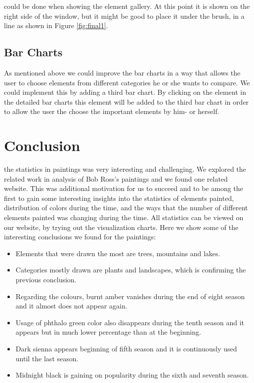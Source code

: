 \documentclass[a4paper]{tufte-book}
\begin{document}
 could be done when showing the element gallery. At this point it is shown on the right side of the window, but it might be good to place it under the brush, in a line as shown in Figure \ref{fig:final1}. \\

\section{Bar Charts}
As mentioned above we could improve the bar charts in a way that allows the user to choose elements from different categories he or she wants to compare. We could implement this by adding a third bar chart. By clicking on the element in the detailed bar charts this element will be added to the third bar chart in order to allow the user the choose the important elements by him- or herself. 

\chapter{Conclusion}
 the statistics in paintings was very interesting and challenging. We explored the related work in analysis of Bob Ross's paintings and we found one related website. This was additional motivation for us to succeed and to be among the first to gain some interesting insights into the statistics of elements painted, distribution of colors during the time, and the ways that the number of different elements painted was changing during the time. All statistics can be viewed on our website, by trying out the visualization charts. Here we show some of the interesting conclusions we found for the paintings: \\

\begin{itemize}
\item Elements that were drawn the most are trees, mountains and lakes.
\item Categories mostly drawn are plants and landscapes, which is confirming the previous conclusion. 
\item Regarding the colours, burnt amber vanishes during the end of eight season and it almost does not appear again.  
\item Usage of phthalo green color also disappears during the tenth season and it appears but in much lower percentage than at the beginning. 
\item Dark sienna appears beginning of fifth season and it is continuously used until the last season. 
\item Midnight black is gaining on popularity during the sixth and seventh season. 
\end{itemize}
\end{document}
